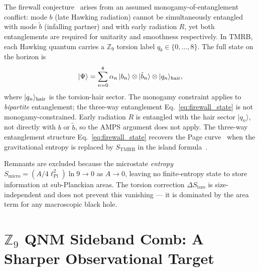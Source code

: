 \documentclass[11pt,a4paper]{article}
\begin{document}
The firewall conjecture~\cite{AMPS2013} arises from an assumed monogamy-of-entanglement
conflict: mode $b$ (late Hawking radiation) cannot be simultaneously entangled
with mode $\tilde{b}$ (infalling partner) and with early radiation $R$, yet both
entanglements are required for unitarity and smoothness respectively.  In TMRB,
each Hawking quantum carries a $\mathbb{Z}_9$ torsion label $q_b \in \{0,\ldots,8\}$.
The full state on the horizon is
\begin{equation}
  |\Psi\rangle = \sum_{n=0}^{8} \alpha_n\,|b_n\rangle \otimes |\tilde{b}_n\rangle \otimes |q_n\rangle_{\rm hair},
  \label{eq:firewall_state}
\end{equation}
where $|q_n\rangle_{\rm hair}$ is the torsion-hair sector.  The monogamy constraint
applies to \emph{bipartite} entanglement; the three-way entanglement Eq.~\eqref{eq:firewall_state}
is not monogamy-constrained.  Early radiation $R$ is entangled with the hair sector
$|q_n\rangle$, not directly with $b$ or $\tilde{b}$, so the AMPS argument does not apply.
The three-way entanglement structure Eq.~\eqref{eq:firewall_state} recovers the
Page curve~\cite{Page1993} when the gravitational entropy is replaced by
$S_{\mathrm{TMRB}}$ in the island formula~\cite{Penington2020}.

Remnants are excluded because the microstate \emph{entropy}
$S_{\mathrm{micro}} = (A/4\ell_{\mathrm{Pl}}^2)\ln 9 \to 0$ as $A\to 0$,
leaving no finite-entropy state to store information at sub-Planckian areas.
The torsion correction $\Delta S_{\mathrm{tors}}$ is size-independent and
does not prevent this vanishing — it is dominated by the area term for any
macroscopic black hole.

\section{$\mathbb{Z}_9$ QNM Sideband Comb: A Sharper Observational Target}
\label{sec:fluid_gravity}
\end{document}
